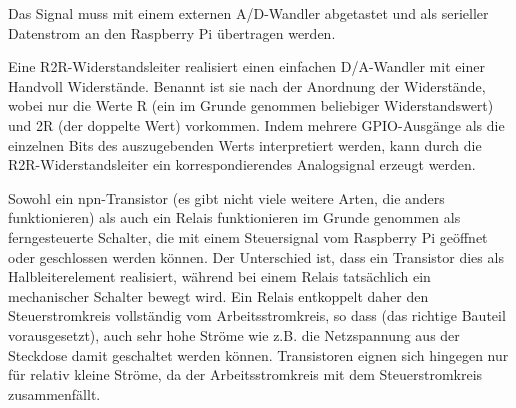 \bigskip
\teilaufgabe
Das Signal muss mit einem externen A/D-Wandler abgetastet und als serieller
Datenstrom an den Raspberry Pi übertragen werden.

\bigskip
\teilaufgabe
Eine R2R-Widerstandsleiter realisiert einen einfachen D/A-Wandler mit einer
Handvoll Widerstände. Benannt ist sie nach der Anordnung der Widerstände, wobei
nur die Werte R (ein im Grunde genommen beliebiger Widerstandswert) und 2R (der
doppelte Wert) vorkommen. Indem mehrere GPIO-Ausgänge als die einzelnen Bits
des auszugebenden Werts interpretiert werden, kann durch die R2R-Widerstandsleiter
ein korrespondierendes Analogsignal erzeugt werden.

\bigskip
\teilaufgabe
Sowohl ein npn-Transistor (es gibt nicht viele weitere Arten, die anders funktionieren)
als auch ein Relais funktionieren im Grunde genommen als ferngesteuerte Schalter, die
mit einem Steuersignal vom Raspberry Pi geöffnet oder geschlossen werden können. Der
Unterschied ist, dass ein Transistor dies als Halbleiterelement realisiert, während bei
einem Relais tatsächlich ein mechanischer Schalter bewegt wird. Ein Relais entkoppelt
daher den Steuerstromkreis vollständig vom Arbeitsstromkreis, so dass (das richtige
Bauteil vorausgesetzt), auch sehr hohe Ströme wie z.B. die Netzspannung aus der
Steckdose damit geschaltet werden können. Transistoren eignen sich hingegen nur für
relativ kleine Ströme, da der Arbeitsstromkreis mit dem Steuerstromkreis zusammenfällt.

